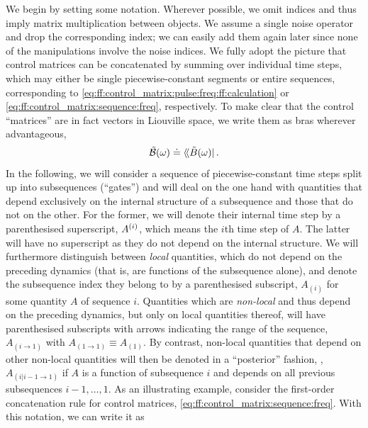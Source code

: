 We begin by setting some notation.
Wherever possible, we omit indices and thus imply matrix multiplication between objects.
We assume a single noise operator and drop the corresponding index; we can easily add them again later since none of the manipulations involve the noise indices.
We fully adopt the picture that control matrices can be concatenated by summing over individual time steps, which may either be single piecewise-constant segments or entire sequences, corresponding to \cref{eq:ff:control_matrix:pulse:freq:ff:calculation} or \cref{eq:ff:control_matrix:sequence:freq}, respectively.
To make clear that the control \enquote{matrices} are in fact vectors in Liouville space, we write them as bras wherever advantageous,
\begin{equation}
    \ctrlmat(\omega) \doteq \dbra*{\Bt(\omega)}.
\end{equation}
In the following, we will consider a sequence of piecewise-constant time steps split up into subsequences (\enquote{gates}) and will deal on the one hand with quantities that depend exclusively on the internal structure of a subsequence and those that do not on the other.
For the former, we will denote their internal time step by a parenthesised superscript, \eg $A^{(i)}$, which means the $i$th time step of $A$.
The latter will have no superscript as they do not depend on the internal structure.
We will furthermore distinguish between \emph{local} quantities, which do not depend on the preceding dynamics (that is, are functions of the subsequence alone), and denote the subsequence index they belong to by a parenthesised subscript, \eg $A_{(i)}$ for some quantity $A$ of sequence $i$.
Quantities which are \emph{non-local} and thus depend on the preceding dynamics, but only on local quantities thereof, will have parenthesised subscripts with arrows indicating the range of the sequence, \eg $A_{(i\to 1)}$ with $A_{(1\to 1)}\equiv A_{(1)}$.
By contrast, non-local quantities that depend on other non-local quantities will then be denoted in a \enquote{posterior} fashion, \eg, $A_{(i|i-1\to 1)}$ if $A$ is a function of subsequence $i$ and depends on all previous subsequences $i-1, \dotsc, 1$.
As an illustrating example, consider the first-order concatenation rule for control matrices, \cref{eq:ff:control_matrix:sequence:freq}.
With this notation, we can write it as
